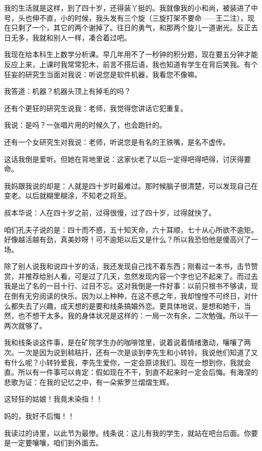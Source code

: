 我的生活就是这样，到了四十岁，还得装丫挺的。我就像我的小和尚，被装进了中号，头也伸不直，小的时候，我头发有三个旋（三旋打架不要命——王二注），现在只剩了一个，其它的两个谢掉了。往日的勇气，和那两个旋儿一道谢光。反正去日无多，我就和别人一样，凑合着过吧。 

我现在给本科生上数学分析课。早几年用不了一秒钟的积分题，现在要五分钟才能反应上来，上课时我常常犯木，前言不搭后语，我也知道有学生在背后笑我。有个狂妄的研究生当面对我说：听说您是软件机器，我看您不像嘛。 

我答道：机器？机器头顶上有掉毛的吗？ 

还有个更狂的研究生说我：老师，我觉得您讲话它犯重复。 

我说：是吗？一张唱片用的时候久了，也会跑针的。 

还有一个女研究生对我说：老师，听说您是有名的王铁嘴，是名不虚传。 

这话我倒是爱听。但她在背地里说：这家伙老了以后一定得吧得吧得，讨厌得要命。 

我妈跟我说的却是：人就是四十岁时最难过。那时候脑子很清楚，可以发现自己在变老。以后就糊里糊涂，不知老之将至。 

叔本华说：人在四十岁之前，过得很慢，过了四十岁，过得就快了。 

咱们孔夫子说的是：四十而不惑，五十知天命，六十耳顺，七十从心所欲不逾矩。好像越活越有劲，真美妙呀！可不逾矩以后又是什么？所以我恐怕他是傻高兴了一场。 

除了别人说我和说四十岁的话，我还发现自己找不着东西；刚看过一本书，击节赞赏，并推荐给别人看，可是过了几天，忽然发现内容一个字也记不起来了。而过去我是出了名的一目十行、过目不忘。这对我倒是一件好事：以前只根书不够读，现在倒有无穷阅读的快乐。因为以上种种，在这不惑之年，我却惶惶不可终日，对什么都失去了兴趣，成天想的是要和线条搞婚外恋。更具体地说，是想和她干，当然，也不想干太多。我的身体状况是这样的：一局一次有余，二次勉强。所以干一两次就够了。 

我和线条谈这件事，是在矿院学生办的咖啡馆里，说着说着情绪激动，嚷嚷了两次。一次是因为说到秫秸扦，还有一次是谈到李先生和小转铃。我说他们知道了又有什么呢？小转铃爱我，李先生爱你，一定会原谅我们。现在一想到你，我就会直。所以有一件事可以肯定：假如现在不干，到直不起来时一定会后悔。有海涅的悲歌为证：在我的记忆之中，有一朵紫罗兰熠熠生辉。 

这轻狂的姑娘！我竟未染指！！ 

妈的，我好不后悔！！ 

我读过的诗里，以此节为最惨。线条说：这儿有我的学生，就站在吧台后面。你要是一定要嚷嚷，咱们到外面去。 

